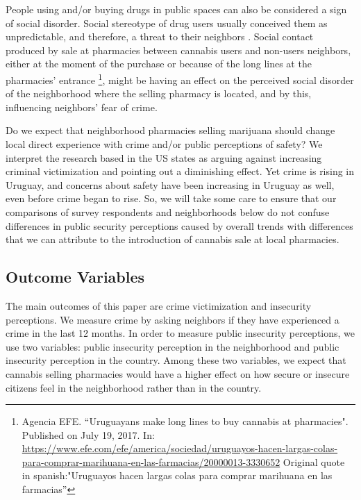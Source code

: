 \documentclass[11pt]{article}
\begin{document}
People using and/or buying drugs in public spaces can also be considered a sign of social disorder. Social stereotype of drug users usually conceived them as unpredictable, and therefore, a threat to their neighbors \citep{bennett1994determinants}. Social contact produced by sale at pharmacies between cannabis users and non-users neighbors, either at the  moment of the purchase or because of the long lines at the pharmacies' entrance \footnote{Agencia EFE. ``Uruguayans make long lines to buy cannabis at pharmacies". Published on July 19, 2017. In: \url{https://www.efe.com/efe/america/sociedad/uruguayos-hacen-largas-colas-para-comprar-marihuana-en-las-farmacias/20000013-3330652} Original quote in spanish:"Uruguayos hacen largas colas para comprar marihuana en las farmacias''}, might be having an effect on the perceived social disorder of the neighborhood where the selling pharmacy is located, and by this, influencing neighbors' fear of crime.

Do we expect that neighborhood pharmacies selling marijuana should change local direct experience with crime and/or public perceptions of safety? We interpret the research based in the US states as arguing against increasing criminal victimization and pointing out a diminishing effect. Yet crime is rising in Uruguay, and concerns about safety have been increasing in Uruguay as well, even before crime began to rise. So, we will take some care to ensure that our comparisons of survey respondents and neighborhoods below do not confuse differences in public security perceptions caused by overall trends with differences that we can attribute to the introduction of cannabis sale at local pharmacies.

\subsection{Outcome Variables}
The main outcomes of this paper are crime victimization and insecurity perceptions. We measure crime by asking neighbors if they have experienced a crime in the last 12 months. In order to measure public insecurity perceptions, we use two variables: public insecurity perception in the neighborhood and public insecurity perception in the country. Among these two variables, we expect that cannabis selling pharmacies would have a higher effect on how secure or insecure citizens feel in the neighborhood rather than in the country.
\end{document}
